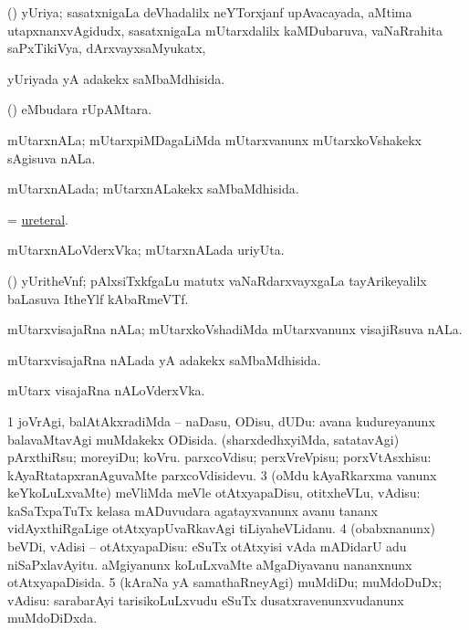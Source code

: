 \bentry
{} 
\gl{\nA}
\expl{}
\bmng
(\jiVra) yUriya; sasatxnigaLa deVhadalilx neYTorxjanf upAvacayada, aMtima utapxnanxvAgidudx, sasatxnigaLa mUtarxdalilx kaMDubaruva, vaNaRrahita saPxTikiVya, dArxvayxsaMyukatx,  
\emng
\eentry

\bentry
{} 
\gl{\gu}
\expl{}
\bmng
yUriyada yA adakekx saMbaMdhisida. 
\emng
\eentry

\bentry
{} 
\gl{\nA}
\expl{}
\bmng
(\ame)  eMbudara rUpAMtara. 
\emng
\eentry

\bentry
{} 
\gl{\nA}
\expl{}
\bmng
mUtarxnALa; mUtarxpiMDagaLiMda mUtarxvanunx mUtarxkoVshakekx sAgisuva nALa. 
\emng
\eentry

\bentry
{} 
\gl{\gu}
\expl{}
\bmng
mUtarxnALada; mUtarxnALakekx saMbaMdhisida. 
\emng
\eentry

\bentry
{} 
\gl{\gu}
\expl{}
\bmng
= \hyperlink{ureteral}{ureteral}. 
\emng
\eentry

\bentry
{} 
\gl{\nA}
\expl{}
\bmng
mUtarxnALoVderxVka; mUtarxnALada uriyUta. 
\emng
\eentry

\bentry
{} 
\gl{\nA}
\expl{}
\bmng
(\ravi) yUritheVnf; pAlxsiTxkfgaLu matutx vaNaRdarxvayxgaLa tayArikeyalilx baLasuva ItheYlf kAbaRmeVTf. 
\emng
\eentry

\bentry
{} 
\gl{\nA}
\bmng
mUtarxvisajaRna nALa; mUtarxkoVshadiMda mUtarxvanunx visajiRsuva nALa. 
\emng
\eentry

\bentry
{} 
\gl{\gu}
\expl{}
\bmng
mUtarxvisajaRna nALada yA adakekx saMbaMdhisida. 
\emng
\eentry

\bentry
{} 
\gl{\nA}
\expl{}
\bmng
mUtarx visajaRna nALoVderxVka. 
\emng
\eentry

\bentry
{} 
\gl{\sakirx}
\expl{}
\bmng
\bnum
\num{1} joVrAgi, balAtAkxradiMda -- naDasu, ODisu, dUDu:  avana kudureyanunx balavaMtavAgi muMdakekx ODisida. 
 (sharxdedhxyiMda, satatavAgi) 
\banum
{} pArxthiRsu; moreyiDu; koVru. 
 parxcoVdisu; perxVreVpisu; porxVtAsxhisu:  kAyaRtatapxranAguvaMte parxcoVdisidevu. 
\eanum
\numie
\num{3} (oMdu kAyaRkarxma \mo vanunx keYkoLuLxvaMte) meVliMda meVle otAtxyapaDisu, otitxheVLu, vAdisu:  kaSaTxpaTuTx kelasa mADuvudara agatayxvanunx avanu tananx vidAyxthiRgaLige otAtxyapUvaRkavAgi tiLiyaheVLidanu. 
\num{4} (obabxnanunx) beVDi, vAdisi -- otAtxyapaDisu:  eSuTx otAtxyisi vAda mADidarU adu niSaPxlavAyitu.  aMgiyanunx koLuLxvaMte aMgaDiyavanu nananxnunx otAtxyapaDisida. 
\num{5} (kAraNa yA samathaRneyAgi) muMdiDu; muMdoDuDx; vAdisu:  sarabarAyi tarisikoLuLxvudu eSuTx dusatxravenunxvudanunx muMdoDiDxda. 
\enum
\emng

